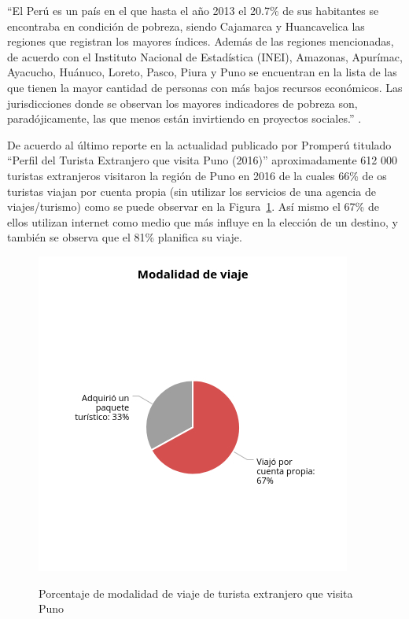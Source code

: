 “El Perú es un país en el que hasta el año 2013 el 20.7\% de sus habitantes se encontraba en condición de pobreza, siendo Cajamarca y Huancavelica las regiones que registran los mayores índices. Además de las regiones mencionadas, de acuerdo con el Instituto Nacional de Estadística (INEI), Amazonas, Apurímac, Ayacucho, Huánuco, Loreto, Pasco, Piura y Puno se encuentran en la lista de las que tienen la mayor cantidad de personas con más bajos recursos económicos. Las jurisdicciones donde se observan los mayores indicadores de pobreza son, paradójicamente, las que menos están invirtiendo en proyectos sociales.” \cite{2017RegionesPeru21}. 

De acuerdo al último reporte en la actualidad publicado por Promperú titulado “Perfil del Turista Extranjero que visita Puno (2016)” aproximadamente 612 000 turistas extranjeros visitaron la región de Puno en 2016 de la cuales 66\% de os turistas viajan por cuenta propia (sin utilizar los servicios de una agencia de viajes/turismo) como se puede observar en la Figura~\ref{fig:modalidad_viaje_extrajero}. Así mismo el 67\% de ellos utilizan internet como medio que más influye en la elección de un destino, y también se observa que el 81\% planifica su viaje.
\begin{figure}[!ht]
    \centering
    \includegraphics[scale=0.7]{Capitulo2/Figs/modalidad_viaje_extrajero.jpg}
    \caption{Porcentaje de modalidad de viaje de turista extranjero que visita Puno}
    \cite{2017PerfilExtranjerob}
    \label{fig:modalidad_viaje_extrajero}
\end{figure}

